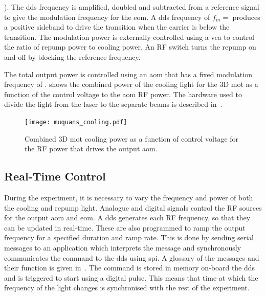 ). The \ac{dds} frequency is amplified, doubled and subtracted
from a  reference signal to give the
modulation frequency for the \ac{eom}. A \ac{dds} frequency of $f_m
=$ produces a positive sideband to drive the
 transition when the carrier is  below
the  transition. The modulation power is externally controlled using a \ac{vca} to control the ratio of
repump power to cooling power. An RF switch turns the repump on and off by blocking the reference frequency. 
\par\noindent 
The total output power is controlled using an
\ac{aom} that has a fixed modulation frequency of
.  shows
the combined power of the cooling light for the 3D \ac{mot} as a
function of the control voltage to the \ac{aom}
RF power. The hardware used to divide the light from the laser to the
separate beams is described in~.
\begin{figure}[htpb]
  \centering
  \texttt{[image: muquans\_cooling.pdf]}
  \caption[Cooling power vs. \ac{aom} control voltage.]{Combined
  3D \ac{mot} cooling power as a function of control voltage for the
  RF power that drives the
\Muquans output \ac{aom}.}
  \label{fig:muquans_cooling}
\end{figure}
\subsection{Real-Time Control} \label{subsec:muquans_comm}
During the experiment, it is necessary to vary the frequency and power
of both
the cooling and repump light.
Analogue and digital signals control the RF sources for the output
\ac{aom} and
\ac{eom}. A \ac{dds} generates each RF frequency, so that they can be
updated in real-time.
These are also
programmed to ramp the output frequency for a specified duration and
ramp rate. This is done by sending serial messages to an
application which interprets the message and synchronously communicates the command to the \ac{dds} using
\ac{spi}. A glossary of the messages and their function is given
in~. The command is stored in memory
on-board the \ac{dds} and
is triggered to start using a digital pulse. This means that time at
which the frequency of the light changes is synchronised with the rest
of the experiment. 
